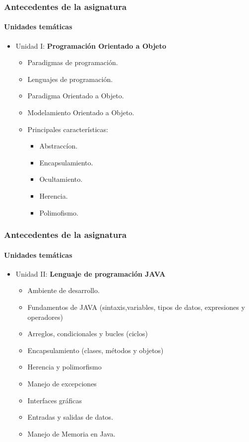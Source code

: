 \documentclass{beamer}
\begin{document}
		\begin{frame}
			\frametitle{Antecedentes de la asignatura}
			\framesubtitle{Unidades tem\'aticas}

			\begin{itemize}
				\item Unidad I: \textbf{Programaci\'on Orientado a Objeto}
				\begin{itemize}
					\item Paradigmas de programaci\'on.
					\item Lenguajes de programaci\'on.
					\item Paradigma Orientado a Objeto.
					\item Modelamiento Orientado a Objeto.
					\item Principales caracter\'isticas:
\begin{itemize}
						\item {Abstracc\'ion}.
						\item {Encapsulamiento}.
						\item {Ocultamiento}.
						\item{ Herencia}.
						\item {Polimofismo}.
\end{itemize}
				\end{itemize}
			\end{itemize}
		\end{frame}

		\begin{frame}
			\frametitle{Antecedentes de la asignatura}
			\framesubtitle{Unidades tem\'aticas}

			\begin{itemize}
				\item Unidad II: \textbf{Lenguaje de programaci\'on JAVA}
				\begin{itemize}
					\item Ambiente  de desarrollo.
					\item Fundamentos de JAVA (sintaxis,variables, tipos de datos, expresiones y operadores)
					\item Arreglos, condicionales y bucles (ciclos)
					\item Encapsulamiento (clases, m\'etodos y objetos)
					\item Herencia y polimorfismo
					\item Manejo de excepciones
					\item Interfaces gr\'aficas
					\item Entradas y salidas de datos.
					\item Manejo de Memoria en Java.
				\end{itemize}
			\end{itemize}
		\end{frame}
\end{document}
